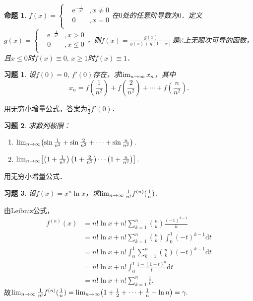 \documentclass[11pt,a4paper]{ctexart}
\makeatletter
\theoremstyle{thmseries} %
\newtheorem{prop}{命题}[section]
\theoremstyle{exerseries}
\newtheorem{exer}{习题}[section]
\renewenvironment{proof}[1][\proofname]{\par
  \pushQED{\qed}%
  \normalfont \topsep6\p@\@plus6\p@\relax
  \trivlist
  \item[\hskip\labelsep
        \itshape
    #1\@addpunct{}]\ignorespaces
}{%
  \popQED\endtrivlist\@endpefalse
}
\newenvironment{sol}{\begin{proof}[\bfseries\upshape 解\quad]}{\end{proof}}
\newcommand{\bra}[1]{\mathopen{}\left(#1\right)}
\newcommand{\sbra}[1]{\mathopen{}\left[#1\right]}
\newcommand{\R}{\mathbb{R}}
\renewcommand{\d}{\mathrm{d}}
\newcommand{\e}{\mathrm{e}}
\def \nti {\mathnormal{n}\to\infty}
\makeatother
\begin{document}
\begin{prop}
	$f(x)=\left\{\begin{aligned}
		&\e^{-\frac{1}{x^2}}&,x\neq0\\
		&0&,x=0\\
	\end{aligned}\right.$在$0$处的任意阶导数为$0$．定义$g(x)=\left\{\begin{aligned}
		&\e^{-\frac{1}{x^2}}&,x>0\\
		&0&,x\leq0\\
	\end{aligned}\right.$，则$f(x)=\frac{g(x)}{g(x)+g(1-x)}$是$\R$上无限次可导的函数，且$x\leq0$时$f(x)\equiv0,\,x\geq1$时$f(x)\equiv1$．
\end{prop}

\begin{exer}
	设$f(0)=0,\,f'(0)$存在，求$\lim_{\nti}x_n$，其中
	\[x_n=f\bra{\frac{1}{n^2}}+f\bra{\frac{2}{n^2}}+\cdots+f\bra{\frac{n}{n^2}}.\]
\end{exer}
\begin{sol}
	用无穷小增量公式，答案为$\frac{1}{2}f'(0)$．
\end{sol}

\begin{exer}
	求数列极限：
	\begin{enumerate}
		\item $\lim_{\nti}\bra{\sin\frac{1}{n^2}+\sin\frac{2}{n^2}+\cdots+\sin\frac{n}{n^2}}.$
		\item $\lim_{\nti}\sbra{\bra{1+\frac{1}{n^2}}\bra{1+\frac{2}{n^2}}\cdots\bra{1+\frac{n}{n^2}}}.$
	\end{enumerate}
\end{exer}
\begin{sol}
	用无穷小增量公式．
\end{sol}

\begin{exer}
	设$f(x)=x^n\ln x$，求$\lim_{\nti}\frac{1}{n!}f^{(n)}(\frac{1}{n})$.
\end{exer}
\begin{sol}
	由Leibniz公式，
	\begin{align*}
		f^{(n)}(x)&=n!\ln x+n!\sum_{k=1}^{n}\binom{n}{k}\frac{(-1)^{k-1}}{k}\\
		&=n!\ln x+n!\sum_{k=1}^{n}\binom{n}{k}\int_{0}^{1}(-t)^{k-1}\d t\\
		&=n!\ln x+n!\int_{0}^{1}\sum_{k=1}^{n}\binom{n}{k}(-t)^{k-1}\d t\\
		&=n!\ln x+n!\int_{0}^{1}\frac{1-(1-t)^n}{t}\d t\\
		&=n!\ln x+n!\sum_{k=1}^{n}\frac{1}{k}.
	\end{align*}
	故$\lim_{\nti}\frac{1}{n!}f^{(n)}(\frac{1}{n})=\lim_{\nti}\bra{1+\frac{1}{2}+\cdots+\frac{1}{n}-\ln n}=\gamma.$
\end{sol}
\end{document}
